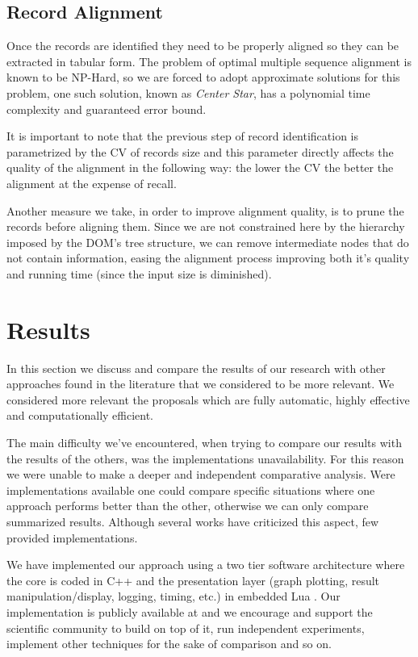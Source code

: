 \documentclass{vldb}
\begin{document}
\subsection{Record Alignment}\label{ss:reca}

Once the records are identified they need to be properly aligned so they can be
extracted in tabular form. The problem of optimal multiple sequence alignment is
known to be NP-Hard\cite{msanphard2006}, so we are forced to adopt approximate
solutions for this problem, one such solution, known as \textit{Center
Star}\cite{centerstar1993}, has a polynomial time complexity and guaranteed
error bound.

It is important to note that the previous step of record identification is
parametrized by the CV of records size and this parameter directly affects the
quality of the alignment in the following way: the lower the CV the better the
alignment at the expense of recall.

Another measure we take, in order to improve alignment quality, is to prune the
records before aligning them. Since we are not constrained here by the hierarchy
imposed by the DOM's tree structure, we can remove intermediate nodes that do
not contain information, easing the alignment process improving both it's
quality and running time (since the input size is diminished).

\section{Results}\label{sec:result}

In this section we discuss and compare the results of our research with other
approaches found in the literature that we considered to be more relevant. We
considered more relevant the proposals which are fully automatic, highly
effective and computationally efficient. 

The main difficulty we've encountered, when trying to compare our results with
the results of the others, was the implementations unavailability. For this
reason we were unable to make a deeper and independent comparative analysis.
Were implementations available one could compare specific situations where one
approach performs better than the other, otherwise we can only compare
summarized results. Although several works have criticized this aspect, few
provided implementations.

We have implemented our approach using a two tier software architecture where
the core is coded in C++ and the presentation layer (graph plotting, result
manipulation/display, logging, timing, etc.) in embedded Lua \cite{luahome}.
Our implementation is publicly available at \cite{} and we encourage and support
the scientific community to build on top of it, run independent experiments,
implement other techniques for the sake of comparison and so on.
\end{document}
